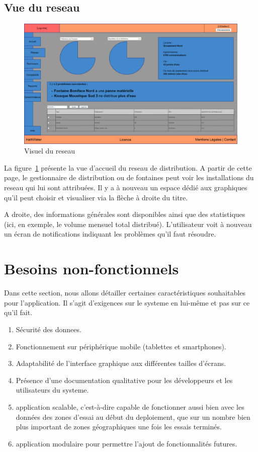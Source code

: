 \documentclass[a4paper, 11pt]{article}
\begin{document}
  \subsection{Vue du \gls{reseau}}
    \begin{figure}[H]
        \centering
        \includegraphics[width=.8\textwidth]{Cahier_des_Charges/reseau}
        \caption{Visuel du \gls{reseau}}
        \label{fig:network}
    \end{figure}
    La figure~\ref{fig:network} présente la vue d'accueil du \gls{reseau} de distribution. A partir de cette page, le gestionnaire de distribution ou de \glspl{fontaine} peut voir les installations du \gls{reseau} qui lui sont attribuées. Il y a à nouveau un espace dédié aux graphiques qu'il peut choisir et visualiser via la flèche à droite du titre.

    A droite, des informations générales sont disponibles ainsi que des statistiques (ici, en exemple, le volume mensuel total distribué).
    L'\gls{utilisateur} voit à nouveau un écran de notifications indiquant les problèmes qu'il faut résoudre.

\section{Besoins non-fonctionnels}
Dans cette section, nous allons détailler certaines caractéristiques souhaitables pour l'\gls{application}. Il s'agit d'exigences sur le \gls{systeme} en lui-même et pas sur ce qu'il fait.
\begin{enumerate}
  \item Sécurité des \glspl{donnee}.
  \item Fonctionnement sur périphérique mobile (tablettes et smartphones).
  \item Adaptabilité de l'interface graphique aux différentes tailles d'écrans.
  \item Présence d'une documentation qualitative pour les développeurs et les \glspl{utilisateur} du \gls{systeme}.
  \item \Ac{application} \gls{scalable}, c'est-à-dire capable de fonctionner aussi bien avec les données des zones d'essai au début du \gls{deploiement}, que sur un nombre bien plus important de zones géographiques une fois les essais terminés.
  \item \Ac{application} \gls{modulaire} pour permettre l'ajout de fonctionnalités futures.
\end{enumerate}
\end{document}
